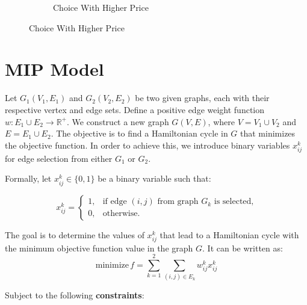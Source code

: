 \documentclass{article}
\begin{document}
\begin{figure}[!ht]
\begin{subfigure}{0.3\textwidth}
    \caption{Choice With Higher Price}%
    \label{fig:your_image3}
  \end{subfigure}%
\end{figure}
\section{MIP Model}
Let $G_1(V_1, E_1)$ and $G_2(V_2, E_2)$ be two given graphs, each with their
respective vertex and edge sets. Define a positive edge weight function $w :
  E_1 \cup E_2 \rightarrow \mathbb{R}^+$. We construct a new graph $G(V, E)$,
where $V = V_1 \cup V_2$ and $E = E_1 \cup E_2$. The objective is to find a
Hamiltonian cycle in $G$ that minimizes the objective function. In order to
achieve this, we introduce binary variables $x_{ij}^k$ for edge selection from
either $G_1$ or $G_2$.

Formally, let $x_{ij}^k \in \{0, 1\}$ be a binary variable such that:

\begin{equation*}
  x_{ij}^k =
  \begin{cases}
    1, & \text{if edge } (i, j) \text{ from graph } G_k \text{ is selected,} \\
    0, & \text{otherwise.}
  \end{cases}
\end{equation*}

The goal is to determine the values of $x_{ij}^k$ that lead to a Hamiltonian
cycle with the minimum objective function value in the graph $G$. It can be
written as:
\begin{equation*}
  \text{minimize} \, f = \sum_{k=1}^{2} \sum_{(i,j) \in E_k} w_{ij}^k x_{ij}^k
\end{equation*}

Subject to the following \textbf{constraints}:
\end{document}
